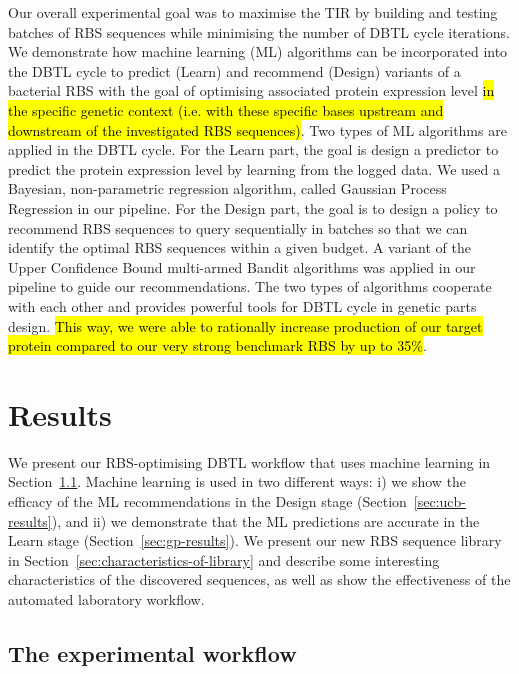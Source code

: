 \documentclass{article}
\begin{document}
Our overall experimental goal was to maximise the TIR by building and testing batches of RBS sequences while minimising the number of DBTL cycle iterations.
We demonstrate how machine learning (ML) algorithms can be incorporated into the DBTL cycle to predict (Learn) and recommend (Design) variants of a bacterial RBS with the goal of optimising associated protein expression level \hl{in the specific genetic context (i.e. with these specific bases upstream and downstream of the investigated RBS sequences)}. 
Two types of ML algorithms are applied in the DBTL cycle. 
For the Learn part, the goal is design a predictor to predict the protein expression level by learning from the logged data. 
We used a Bayesian, non-parametric regression algorithm, called Gaussian Process Regression \cite{Rasmussen2004} in our pipeline. 
For the Design part, the goal is to design a policy to recommend RBS sequences to query sequentially in batches so that we can identify the optimal RBS sequences within a given budget. 
A variant of the Upper Confidence Bound multi-armed Bandit algorithms \cite{desautels2014parallelizing} was applied in our pipeline to guide our recommendations. 
The two types of algorithms cooperate with each other and provides powerful tools for DBTL cycle in genetic parts design.
\hl{This way, we were able to rationally increase production of our target protein compared to our very strong benchmark RBS by up to 35\%}. \\


\section{Results}

We present our RBS-optimising DBTL workflow that uses machine learning in Section~\ref{sec:dbtl-workflow}.
Machine learning is used in two different ways: i) we show the efficacy of the ML recommendations
in the Design stage (Section~\ref{sec:ucb-results}),
and ii) we demonstrate that the ML predictions are accurate in the Learn stage (Section~\ref{sec:gp-results}).
We present our new RBS sequence library in Section~\ref{sec:characteristics-of-library} and describe some interesting
characteristics of the discovered sequences,
as well as show the effectiveness of the automated laboratory workflow.

\subsection{The experimental workflow}
\label{sec:dbtl-workflow}
\end{document}
